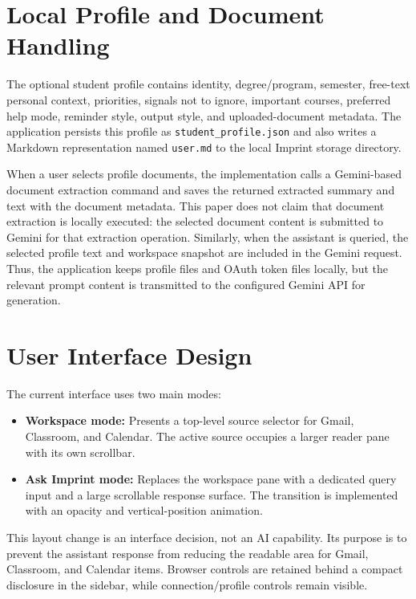 \documentclass[conference]{IEEEtran}
\begin{document}
\section{Local Profile and Document Handling}

The optional student profile contains identity, degree/program, semester, free-text personal context, priorities, signals not to ignore, important courses, preferred help mode, reminder style, output style, and uploaded-document metadata. The application persists this profile as \texttt{student\_profile.json} and also writes a Markdown representation named \texttt{user.md} to the local Imprint storage directory.

When a user selects profile documents, the implementation calls a Gemini-based document extraction command and saves the returned extracted summary and text with the document metadata. This paper does not claim that document extraction is locally executed: the selected document content is submitted to Gemini for that extraction operation. Similarly, when the assistant is queried, the selected profile text and workspace snapshot are included in the Gemini request. Thus, the application keeps profile files and OAuth token files locally, but the relevant prompt content is transmitted to the configured Gemini API for generation.

\section{User Interface Design}

The current interface uses two main modes:

\begin{itemize}
    \item \textbf{Workspace mode:} Presents a top-level source selector for Gmail, Classroom, and Calendar. The active source occupies a larger reader pane with its own scrollbar.
    \item \textbf{Ask Imprint mode:} Replaces the workspace pane with a dedicated query input and a large scrollable response surface. The transition is implemented with an opacity and vertical-position animation.
\end{itemize}

This layout change is an interface decision, not an AI capability. Its purpose is to prevent the assistant response from reducing the readable area for Gmail, Classroom, and Calendar items. Browser controls are retained behind a compact disclosure in the sidebar, while connection/profile controls remain visible.
\end{document}
